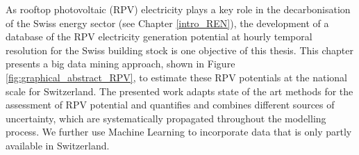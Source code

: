 As rooftop photovoltaic (RPV) electricity plays a key role in the decarbonisation of the Swiss energy sector (see Chapter \ref{intro_REN}), the development of a database of the RPV electricity generation potential at hourly temporal resolution for the Swiss building stock is one objective of this thesis.
This chapter presents a big data mining approach, shown in Figure \ref{fig:graphical_abstract_RPV}, to estimate these RPV potentials at the national scale for Switzerland. 
The presented work adapts state of the art methods for the assessment of RPV potential and quantifies and combines different sources of uncertainty, which are systematically propagated throughout the modelling process.
We further use Machine Learning to incorporate data that is only partly available in Switzerland.

